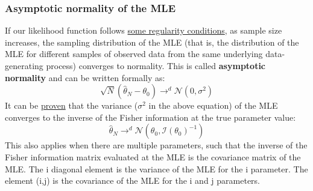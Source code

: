\documentclass[12pt]{article}
\begin{document}
\subsubsection{Asymptotic normality of the MLE}
If our likelihood function follows \href{https://en.wikipedia.org/wiki/Fisher_information#Regularity_conditions}{some regularity conditions}, as sample size increases, the sampling distribution of the MLE (that is, the distribution of the MLE for different samples of observed data from the same underlying data-generating process) converges to normality. This is called \textbf{asymptotic normality} and can be written formally as:
$$
\sqrt{N}
(\hat{\theta}_N - \theta_0)
\rightarrow^d
\mathcal{N}(0, \sigma^2)
$$
It can be \href{https://gregorygundersen.com/blog/2019/11/28/asymptotic-normality-mle/}{proven} that the variance ($\sigma^2$ in the above equation) of the MLE converges to the inverse of the Fisher information at the true parameter value:
$$
\hat{\theta}_N
\rightarrow^d
\mathcal{N}(\theta_0, \mathcal{I}(\theta_0)^{-1})
$$
This also applies when there are multiple parameters, such that the inverse of the Fisher information matrix evaluated at the MLE is the covariance matrix of the MLE.
The i diagonal element is the variance of the MLE for the i parameter.
The element (i,j) is the covariance of the MLE for the i and j parameters.
\end{document}
